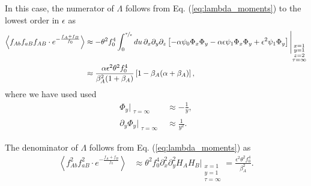 \documentclass[aps,rmp,twocolumn,groupedaddress,floatfix,notitlepage]{revtex4-1}
\begin{document}
In this case, the numerator of $\Lambda$ follows from Eq. (\ref{eq:lambda_moments}) to the lowest order in $\epsilon$ as
\begin{align}\label{eq:lambda_num_large_rho}
    \left\langle f_{Ab}f_{aB}f_{AB}\cdot e^{-\frac{f_{A}+f_{B}}{f_0}}\right\rangle
 &\approx -\theta^2 f_0^4 \int_0^{\nicefrac{\tau}{\epsilon}} du\, \partial_x\partial_y\partial_z \left[-\alpha \psi_0\Phi_x\Phi_y -\alpha \epsilon \psi_1 \Phi_x\Phi_y + \epsilon^2 \psi_1\Phi_y \right]\Bigg\vert_{\substack{x=1 \\ y=1 \\ z=2 \\ \tau=\infty}} \\ \nonumber
 &\approx \frac{\alpha \epsilon^2 \theta^2 f_0^4}{\beta_A^2 (1+\beta_A)} \left[1 - \beta_A(\alpha+\beta_A) \right]
 ,
\end{align}
where we have used used
\begin{subequations}\begin{align}
    \Phi_y \Big\vert_{\substack{\tau=\infty}} &\approx - \frac{1}{y} 
    , \\
    \partial_y \Phi_y \Big\vert_{\substack{\tau=\infty}} &\approx \frac{1}{y^2} 
    .
\end{align}\end{subequations}

The denominator of $\Lambda$ follows from Eq. (\ref{eq:lambda_moments}) as 
\begin{align}
    \left\langle f_{Ab}^2f_{aB}^2\cdot e^{-\frac{f_{A}+f_{B}}{f_0}}\right\rangle &\approx \theta^2 f_0^4 \partial_x^2 \partial_y^2 H_A H_B \Bigg\vert_{\substack{x=1 \\ y=1 \\ \tau=\infty}} 
    = \frac{\epsilon^2 \theta^2 f_0^4}{\beta_A^2}.
\end{align}
\end{document}
